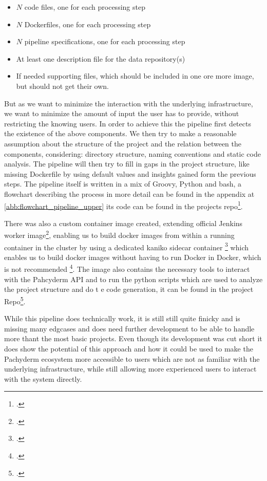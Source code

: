 \begin{itemize}
    \item $N$ code files, one for each processing step
    \item $N$ Dockerfiles, one for each processing step
    \item $N$ pipeline specifications, one for each processing step
    \item At least one description file for the data repository(s)
    \item If needed supporting files, which should be included in one ore more image, but should not get their own.
\end{itemize}

But as we want to minimize the interaction with the underlying infrastructure, we want to minimize the amount of input the user has to provide, without restricting the knowing users.
In order to achieve this the pipeline first detects the existence of the above components.
We then try to make a reasonable assumption about the structure of the project and the relation between the components, considering: directory structure, naming conventions and static code analysis.
The pipeline will then try to fill in gaps in the project structure, like missing Dockerfile by using default values and insights gained form the previous steps.
The pipeline itself is written in a mix of Groovy, Python and bash, a flowchart describing the process in more detail can be found in the appendix at \ref{abb:flowchart_pipeline_upper} its code can be found in the projects repo\footcite{Pipeline}.

There was also a custom container image created, extending official Jenkins worker image\footcite{JenkinsJenkinsDocker}, enabling us to build docker images from within a running container in the cluster by using a dedicated kaniko 
sidecar container \footcite{KanikoBuildImages2023} which enables us to build docker images without having to run Docker in Docker, which is not recommended \footcite{UsingDockerinDockerYour}.
The image also contains the necessary tools to interact with the Pahcyderm API and to run the python scripts which are used to analyze the project structure and do t   e code generation, it can be found in the project Repo\footcite{PipelineImage}.

While this pipeline does technically work, it is still still quite finicky and is missing many edgcases and does need further development to be able to handle more thant the most basic projects.
Even though its development was cut short it does show the potential of this approach and how it could be used to make the Pachyderm ecosystem more accessible to users which are not as familiar with the underlying infrastructure, 
while still allowing more experienced users to interact with the system directly.